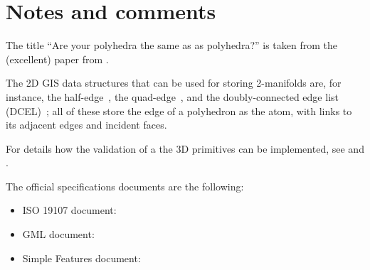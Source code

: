 %
\section{Notes and comments}

The title ``Are your polyhedra the same as as polyhedra?'' is taken from the (excellent) paper from \citet{Grunbaum03}.

The 2D GIS data structures that can be used for storing 2-manifolds are, for instance, the half-edge~\citep{Mantyla88}, the quad-edge~\citep{Guibas85}, and the doubly-connected edge list (DCEL)~\citep{Muller78}; all of these store the edge of a polyhedron as the atom, with links to its adjacent edges and incident faces.

For details how the validation of a the 3D primitives can be implemented, see \citet{13_cacaie} and \citet{18_ogdss_val3dity}.

The official specifications documents are the following:
\begin{itemize}
  \item ISO 19107 document: \citet{ISO19107}
  \item GML document: \citet{OGC-GML}
  \item Simple Features document: \citet{OGC-SF}
\end{itemize}
